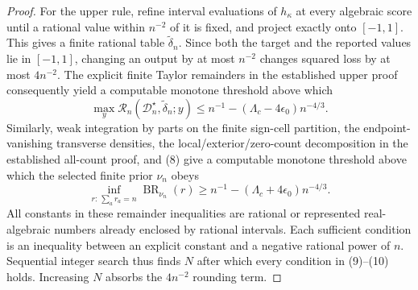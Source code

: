 \documentclass{article}
\begin{document}
\begin{proof}
For the upper rule, refine interval evaluations of \(h_\kappa\) at every algebraic score until a rational value within \(n^{-2}\) of it is fixed, and project exactly onto \([-1,1]\).  This gives a finite rational table \(\widetilde\delta_n\).  Since both the target and the reported values lie in \([-1,1]\), changing an output by at most \(n^{-2}\) changes squared loss by at most \(4n^{-2}\).  The explicit finite Taylor remainders in the established upper proof consequently yield a computable monotone threshold above which
\[
\max_y\mathcal R_n(\mathcal D_n^\star,\widetilde\delta_n;y)
\le n^{-1}-(\Lambda_c-4\epsilon_0)n^{-4/3}.
\tag{9}
\]
Similarly, weak integration by parts on the finite sign-cell partition, the endpoint-vanishing transverse densities, the local/exterior/zero-count decomposition in the established all-count proof, and (8) give a computable monotone threshold above which the selected finite prior \(\nu_n\) obeys
\[
\inf_{r:\,\sum_ar_a=n}\operatorname{BR}_{\nu_n}(r)
\ge n^{-1}-(\Lambda_c+4\epsilon_0)n^{-4/3}.
\tag{10}
\]
All constants in these remainder inequalities are rational or represented real-algebraic numbers already enclosed by rational intervals.  Each sufficient condition is an inequality between an explicit constant and a negative rational power of \(n\).  Sequential integer search thus finds \(N\) after which every condition in (9)--(10) holds.  Increasing \(N\) absorbs the \(4n^{-2}\) rounding term.


\end{proof}
\end{document}
